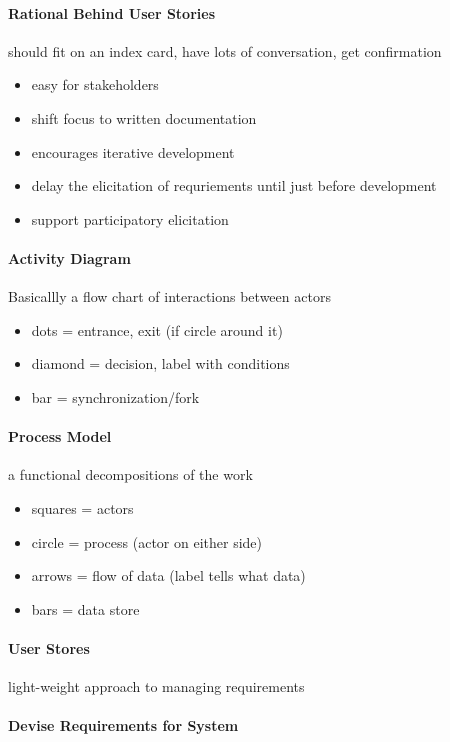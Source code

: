 \documentclass[12pt]{article}
\begin{document}
\paragraph{Rational Behind User Stories} 
\label{par:rational_behind_user_stories}
should fit on an index card, have lots of conversation, get confirmation
\begin{itemize}
	\item easy for stakeholders
	\item shift focus to written documentation
	\item encourages iterative development
	\item delay the elicitation of requriements until just before development
	\item support participatory elicitation
\end{itemize}

\paragraph{Activity Diagram} 
\label{par:activity_diagram}
Basicallly a flow chart of interactions between actors
\begin{itemize}
	\item dots = entrance, exit (if circle around it)
	\item diamond = decision, label with conditions
	\item bar = synchronization/fork
\end{itemize}

\paragraph{Process Model} 
\label{par:process_model}
a functional decompositions of the work
\begin{itemize}
	\item squares = actors
	\item circle = process (actor on either side)
	\item arrows = flow of data (label tells what data)
	\item bars = data store
\end{itemize}

\paragraph{User Stores} 
\label{par:user_stores}
light-weight approach to managing requirements

\paragraph{Devise Requirements for System} 
\label{par:devise_requirements_for_system}
\end{document}
